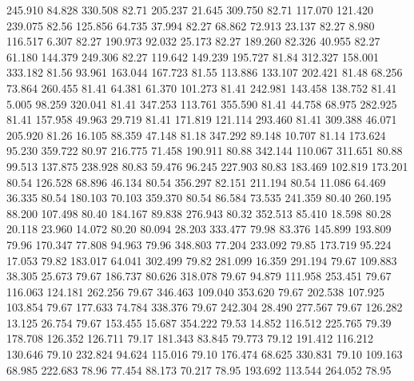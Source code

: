  245.910   84.828  330.508        82.71
 205.237   21.645  309.750        82.71
 117.070  121.420  239.075        82.56
 125.856   64.735   37.994        82.27
  68.862   72.913   23.137        82.27
   8.980  116.517    6.307        82.27
 190.973   92.032   25.173        82.27
 189.260   82.326   40.955        82.27
  61.180  144.379  249.306        82.27
 119.642  149.239  195.727        81.84
 312.327  158.001  333.182        81.56
  93.961  163.044  167.723        81.55
 113.886  133.107  202.421        81.48
  68.256   73.864  260.455        81.41
  64.381   61.370  101.273        81.41
 242.981  143.458  138.752        81.41
   5.005   98.259  320.041        81.41
 347.253  113.761  355.590        81.41
  44.758   68.975  282.925        81.41
 157.958   49.963   29.719        81.41
 171.819  121.114  293.460        81.41
 309.388   46.071  205.920        81.26
  16.105   88.359   47.148        81.18
 347.292   89.148   10.707        81.14
 173.624   95.230  359.722        80.97
 216.775   71.458  190.911        80.88
 342.144  110.067  311.651        80.88
  99.513  137.875  238.928        80.83
  59.476   96.245  227.903        80.83
 183.469  102.819  173.201        80.54
 126.528   68.896   46.134        80.54
 356.297   82.151  211.194        80.54
  11.086   64.469   36.335        80.54
 180.103   70.103  359.370        80.54
  86.584   73.535  241.359        80.40
 260.195   88.200  107.498        80.40
 184.167   89.838  276.943        80.32
 352.513   85.410   18.598        80.28
  20.118   23.960   14.072        80.20
  80.094   28.203  333.477        79.98
  83.376  145.899  193.809        79.96
 170.347   77.808   94.963        79.96
 348.803   77.204  233.092        79.85
 173.719   95.224   17.053        79.82
 183.017   64.041  302.499        79.82
 281.099   16.359  291.194        79.67
 109.883   38.305   25.673        79.67
 186.737   80.626  318.078        79.67
  94.879  111.958  253.451        79.67
 116.063  124.181  262.256        79.67
 346.463  109.040  353.620        79.67
 202.538  107.925  103.854        79.67
 177.633   74.784  338.376        79.67
 242.304   28.490  277.567        79.67
 126.282   13.125   26.754        79.67
 153.455   15.687  354.222        79.53
  14.852  116.512  225.765        79.39
 178.708  126.352  126.711        79.17
 181.343   83.845   79.773        79.12
 191.412  116.212  130.646        79.10
 232.824   94.624  115.016        79.10
 176.474   68.625  330.831        79.10
 109.163   68.985  222.683        78.96
  77.454   88.173   70.217        78.95
 193.692  113.544  264.052        78.95
